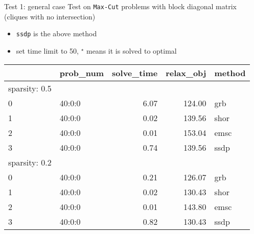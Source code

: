 
\begin{frame}{Test 1: general case}
  Test on \texttt{Max-Cut} problems with block diagonal matrix (cliques with no intersection)
  \begin{itemize}
    \item \texttt{ssdp} is the above method
    \item set time limit to 50, \(^\star\) means it is solved to optimal
  \end{itemize}

  \begin{tabular}{llrrl}
    \toprule
    {} & prob\_num & solve\_time & relax\_obj & method \\
    \midrule
    sparsity: 0.5                                      \\
    0  & 40:0:0    & 6.07        & 124.00     & grb    \\
    1  & 40:0:0    & 0.02        & 139.56     & shor   \\
    2  & 40:0:0    & 0.01        & 153.04     & emsc   \\
    3  & 40:0:0    & 0.74        & 139.56     & ssdp   \\
    \midrule
    sparsity: 0.2                                      \\
    0  & 40:0:0    & 0.21        & 126.07     & grb    \\
    1  & 40:0:0    & 0.02        & 130.43     & shor   \\
    2  & 40:0:0    & 0.01        & 143.80     & emsc   \\
    3  & 40:0:0    & 0.82        & 130.43     & ssdp   \\
    \bottomrule
  \end{tabular}

\end{frame}


